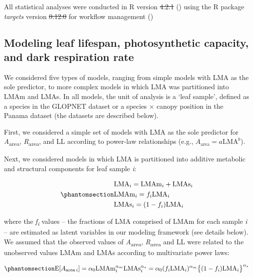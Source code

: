 \documentclass[
  12pt,
  letterpaper,
  DIV=11,
  numbers=noendperiod]{scrartcl}
\providecommand{\DIFadd}[1]{{\protect\color{blue}\uwave{#1}}} %
\providecommand{\DIFdel}[1]{{\protect\color{red}\sout{#1}}}                      %
\providecommand{\DIFaddbegin}{} %
\providecommand{\DIFaddend}{} %
\providecommand{\DIFdelbegin}{} %
\providecommand{\DIFdelend}{} %
\newcommand{\DIFscaledelfig}{0.5}
\newlength{\DIFdelgraphicswidth} %
\newlength{\DIFdelgraphicsheight} %
\newcommand{\DIFaddincludegraphics}[2][]{{\color{blue}\fbox{\DIFOincludegraphics[#1]{#2}}}} %
\newcommand{\DIFdelincludegraphics}[2][]{%
\sbox{\DIFdelgraphicsbox}{\DIFOincludegraphics[#1]{#2}}%
\settoboxwidth{\DIFdelgraphicswidth}{\DIFdelgraphicsbox} %
\settoboxtotalheight{\DIFdelgraphicsheight}{\DIFdelgraphicsbox} %
\scalebox{\DIFscaledelfig}{%
\parbox[b]{\DIFdelgraphicswidth}{\usebox{\DIFdelgraphicsbox}\\[-\baselineskip] \rule{\DIFdelgraphicswidth}{0em}}\llap{\resizebox{\DIFdelgraphicswidth}{\DIFdelgraphicsheight}{%
\setlength{\unitlength}{\DIFdelgraphicswidth}%
\begin{picture}(1,1)%
\thicklines\linethickness{2pt} %
{\color[rgb]{1,0,0}\put(0,0){\framebox(1,1){}}}%
{\color[rgb]{1,0,0}\put(0,0){\line( 1,1){1}}}%
{\color[rgb]{1,0,0}\put(0,1){\line(1,-1){1}}}%
\end{picture}%
}\hspace*{3pt}}} %
} %
\DeclareRobustCommand{\DIFaddbegin}{\DIFOaddbegin \let\includegraphics\DIFaddincludegraphics} %
\DeclareRobustCommand{\DIFaddend}{\DIFOaddend \let\includegraphics\DIFOincludegraphics} %
\DeclareRobustCommand{\DIFdelbegin}{\DIFOdelbegin \let\includegraphics\DIFdelincludegraphics} %
\DeclareRobustCommand{\DIFdelend}{\DIFOaddend \let\includegraphics\DIFOincludegraphics} %
\begin{document}
All statistical analyses were conducted in R version \DIFdelbegin \DIFdel{4.2.1
}\DIFdelend \DIFaddbegin \DIFadd{4.3.2
}\DIFaddend () using the R package
\emph{targets} version \DIFdelbegin \DIFdel{0.12.0 }\DIFdelend \DIFaddbegin \DIFadd{1.5.1 }\DIFaddend for workflow management
()

\subsection{Modeling leaf lifespan, photosynthetic capacity, and dark
respiration
rate}\label{modeling-leaf-lifespan-photosynthetic-capacity-and-dark-respiration-rate}

We considered five types of models, ranging from simple models with LMA
as the sole predictor, to more complex models in which LMA was
partitioned into LMAm and LMAs. In all models, the unit of analysis is a
`leaf sample', defined as a species in the GLOPNET dataset or a species
\(\times\) canopy position in the Panama dataset (the datasets are
described below).

First, we considered a simple set of models with LMA as the sole
predictor for \emph{A}\textsubscript{area},
\emph{R}\textsubscript{area}, and LL according to power-law
relationships (e.g., \(A_{\mathrm{area}} = a\mathrm{LMA}^b\)).

Next, we considered models in which LMA is partitioned into additive
metabolic and structural components for leaf sample \emph{i}:

\begin{equation}\phantomsection\label{eq-LMA}{
\begin{aligned}
  &\mathrm{LMA}_{i} =\mathrm{LMAm}_{i} + \mathrm{LMAs}_{i} \\
  &\mathrm{LMAm}_{i} = f_{i} \mathrm{LMA}_{i} \\
  &\mathrm{LMAs}_{i} = (1 - f_{i})  \mathrm{LMA}_{i}
\end{aligned}
}\end{equation}

where the \emph{f\textsubscript{i}} values -- the fractions of LMA
comprised of LMAm for each sample \emph{i} -- are estimated as latent
variables in our modeling framework (see details below). We assumed that
the observed values of \emph{A}\textsubscript{area},
\emph{R}\textsubscript{area} and LL were related to the unobserved
values LMAm and LMAs according to multivariate power laws:

\begin{equation}\phantomsection\label{eq-Aarea}{
\mathrm{E}[A_{\mathrm{area} \, i}]
= \alpha_0\mathrm{LMAm}_{i}^{\alpha_m}\mathrm{LMAs}_i^{\alpha_s}  =  \alpha_0 (f_i \mathrm{LMA}_{i})^{\alpha_m} \bigl\{(1-f_i) \mathrm{LMA}_{i}\bigr\}^{\alpha_s}
}\end{equation}
\end{document}
